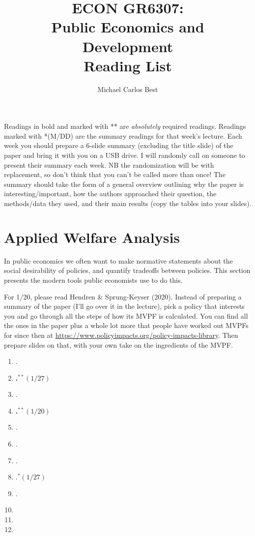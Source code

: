 \documentclass[11pt]{article}
\begin{document}
\title{ECON GR6307: \\ Public Economics and Development \\ Reading List}
\author{Michael Carlos Best}

\maketitle

Readings in bold and marked with ** are \textit{absolutely} required readings. Readings marked with *(M/DD) are the summary readings for that week's lecture. Each week you should prepare a 6-slide summary (excluding the title slide) of the paper and bring it with you on a USB drive. I will randomly call on someone to present their summary each week. NB the randomization will be with replacement, so don't think that you can't be called more than once! The summary should take the form of a general overview outlining why the paper is interesting/important, how the authors approached their question, the methods/data they used, and their main results (copy the tables into your slides).

\section{Applied Welfare Analysis}

In public economics we often want to make normative statements about the social desirability of policies, and quantify tradeoffs between policies. This section presents the modern tools public economists use to do this. 

For 1/20, please read Hendren \& Sprung-Keyser (2020). Instead of preparing a summary of the paper (I'll go over it in the lecture), pick a policy that interests you and go through all the steps of how its MVPF is calculated. You can find all the ones in the paper plus a whole lot more that people have worked out MVPFs for since then at \url{https://www.policyimpacts.org/policy-impacts-library}. Then prepare slides on that, with your own take on the ingredients of the MVPF.

\begin{enumerate}
\item {}.
\item \textbf{.$^{**}(1/27)$}
\item {}.
\item \textbf{.$^{**}(1/20)$}
\item {}.
\item {}.
\item {}.
\item {}.$^{*}(1/27)$
\item {}.
\item {}
\item {}
\item {}
\end{enumerate}
\end{document}
